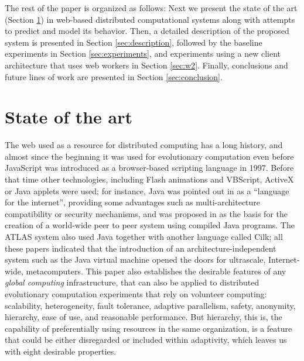 \documentclass[journal,onecolumn]{IEEEtran}
\begin{document}
The rest of the paper is organized as follows: Next we present the
state of the art (Section \ref{sec:soa}) in web-based distributed
computational systems along with attempts to predict and model its behavior. 
Then, a detailed description of the proposed system is presented
in Section \ref{sec:description}, followed by the baseline experiments
in Section \ref{sec:experiments}, and experiments using a new client
architecture that uses web workers in Section \ref{sec:w2}.
Finally, conclusions and future lines of work are presented in Section
\ref{sec:conclusion}. 

\section{State of the art}
\label{sec:soa}

The web used as a resource for distributed computing has a
long history, and almost since the beginning it was used for
evolutionary computation even before JavaScript was
introduced as a browser-based scripting language in 1997. Before that
time other technologies,
 including Flash animations and VBScript, ActiveX or Java applets were
used; for instance, Java was pointed out in \cite{soares1998get} as a
``language for the
internet'', providing some advantages such as multi-architecture compatibility or
security mechanisms, and was proposed in \cite{chandy1996world} as the
basis for the creation of a world-wide peer to peer system using compiled Java
programs. The ATLAS system
\cite{Baldeschwieler:1996:TIG:504450.504482} also used Java together
with another language called Cilk; all these papers indicated that
the introduction of an architecture-independent system such as the
Java virtual machine opened the doors for ultrascale, Internet-wide,
metacomputers. This paper also establishes the desirable features of
any {\em global computing} infrastructure, that can also be applied to
distributed evolutionary computation experiments that rely on
volunteer computing: scalability, heterogeneity, fault tolerance,
adaptive parallelism, safety, anonymity, hierarchy, ease of use, and
reasonable performance. But hierarchy, this is, the capability of
preferentially using resources in the same organization, is a feature
that could be either disregarded or included within adaptivity, which
leaves us with eight desirable properties. 
\end{document}
